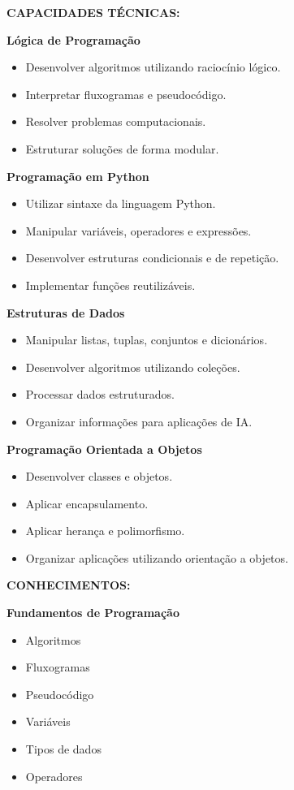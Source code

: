 \textbf{CAPACIDADES TÉCNICAS:}

\textbf{Lógica de Programação}

\begin{itemize}
\item Desenvolver algoritmos utilizando raciocínio lógico.
\item Interpretar fluxogramas e pseudocódigo.
\item Resolver problemas computacionais.
\item Estruturar soluções de forma modular.
\end{itemize}

\textbf{Programação em Python}

\begin{itemize}
\item Utilizar sintaxe da linguagem Python.
\item Manipular variáveis, operadores e expressões.
\item Desenvolver estruturas condicionais e de repetição.
\item Implementar funções reutilizáveis.
\end{itemize}

\textbf{Estruturas de Dados}

\begin{itemize}
\item Manipular listas, tuplas, conjuntos e dicionários.
\item Desenvolver algoritmos utilizando coleções.
\item Processar dados estruturados.
\item Organizar informações para aplicações de IA.
\end{itemize}

\textbf{Programação Orientada a Objetos}

\begin{itemize}
\item Desenvolver classes e objetos.
\item Aplicar encapsulamento.
\item Aplicar herança e polimorfismo.
\item Organizar aplicações utilizando orientação a objetos.
\end{itemize}

\textbf{CONHECIMENTOS:}

\textbf{Fundamentos de Programação}

\begin{itemize}
\item Algoritmos
\item Fluxogramas
\item Pseudocódigo
\item Variáveis
\item Tipos de dados
\item Operadores
\end{itemize}


